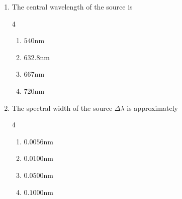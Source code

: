 \documentclass[journal,12pt,onecolumn]{IEEEtran}
\theoremstyle{remark}
\begin{document}
\begin{enumerate}
\item The central wavelength of the source is \par \hfill{}
\begin{multicols}{4}
\begin{enumerate}
    \item $540\text{nm}$
    \item $632.8\text{nm}$
    \item $667\text{nm}$
    \item $720\text{nm}$
\end{enumerate}    
\end{multicols}

\vspace{0.5cm}

\item The spectral width of the source $\Delta\lambda$ is approximately \par \hfill{}
\begin{multicols}{4}
\begin{enumerate}
    \item $0.0056\text{nm}$
    \item $0.0100\text{nm}$
    \item $0.0500\text{nm}$
    \item $0.1000\text{nm}$
\end{enumerate}    
\end{multicols}

\vspace{0.5cm}

 
\end{enumerate}
\end{document}
